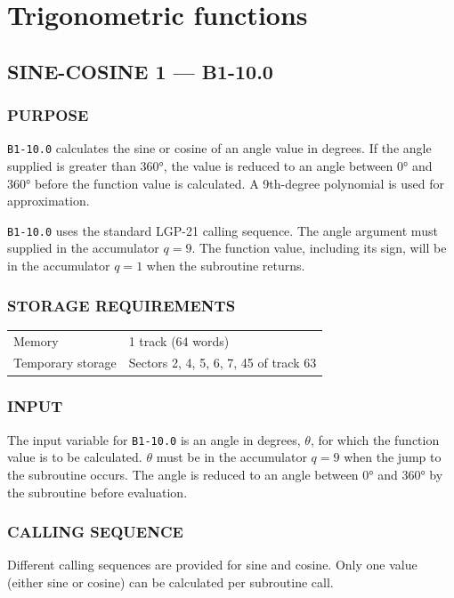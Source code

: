 \section{Trigonometric functions}

\subsection*{SINE-COSINE 1 --- B1-10.0}
\label{sec:sine_cosine_1}

\subsubsection*{PURPOSE}
\texttt{B1-10.0} calculates the sine or cosine of an angle value in degrees. If the angle supplied is greater than 360°, the value is reduced to an angle between 0° and 360° before the function value is calculated. A 9th-degree polynomial is used for approximation.

\texttt{B1-10.0} uses the standard LGP-21 calling sequence. The angle argument must supplied in the accumulator $q=9$. The function value, including its sign, will be in the accumulator $q=1$ when the subroutine returns.

\subsubsection*{STORAGE REQUIREMENTS}
\begin{center}
\begin{tabular}{ll}
    \toprule
    Memory & 1 track (64 words) \\
    Temporary storage & Sectors 2, 4, 5, 6, 7, 45 of track 63 \\
    \bottomrule
\end{tabular}
\end{center}

\subsubsection*{INPUT}
The input variable for \texttt{B1-10.0} is an angle in degrees, $\theta$, for which the function value is to be calculated. $\theta$ must be in the accumulator $q=9$ when the jump to the subroutine occurs. The angle is reduced to an angle between 0° and 360° by the subroutine before evaluation.

\subsubsection*{CALLING SEQUENCE}
Different calling sequences are provided for sine and cosine. Only one value (either sine or cosine) can be calculated per subroutine call.

